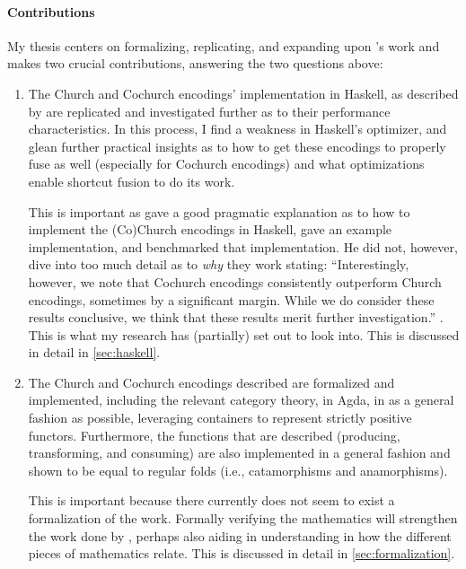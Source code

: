 \paragraph{Contributions}
My thesis centers on formalizing, replicating, and expanding upon \cite{Harper2011}'s work and makes two crucial contributions, answering the two questions above:
\begin{enumerate}
    \item The Church and Cochurch encodings' implementation in Haskell, as described by \cite{Harper2011} are replicated and investigated further as to their performance characteristics.
    In this process, I find a weakness in Haskell's optimizer, and glean further practical insights as to how to get these encodings to properly fuse as well (especially for Cochurch encodings) and what optimizations enable shortcut fusion to do its work.

    This is important as \cite{Harper2011} gave a good pragmatic explanation as to how to implement the (Co)Church encodings in Haskell, gave an example implementation, and benchmarked that implementation.
    He did not, however, dive into too much detail as to \textit{why} they work stating: ``Interestingly, however, we note that Cochurch encodings consistently outperform Church encodings, sometimes by a significant margin. While we do consider these results conclusive, we think that these results merit further investigation.'' \citep{Harper2011}.
    This is what my research has (partially) set out to look into.
    This is discussed in detail in \autoref{sec:haskell}.
    \item The Church and Cochurch encodings described are formalized and implemented, including the relevant category theory, in Agda, in as a general fashion as possible, leveraging containers \citep{Abbott2005} to represent strictly positive functors.
    Furthermore, the functions that are described (producing, transforming, and consuming) are also implemented in a general fashion and shown to be equal to regular folds (i.e., catamorphisms and anamorphisms).

    This is important because there currently does not seem to exist a formalization of the work.
    Formally verifying the mathematics will strengthen the work done by \cite{Harper2011}, perhaps also aiding in understanding in how the different pieces of mathematics relate.
    This is discussed in detail in \autoref{sec:formalization}.
\end{enumerate}




